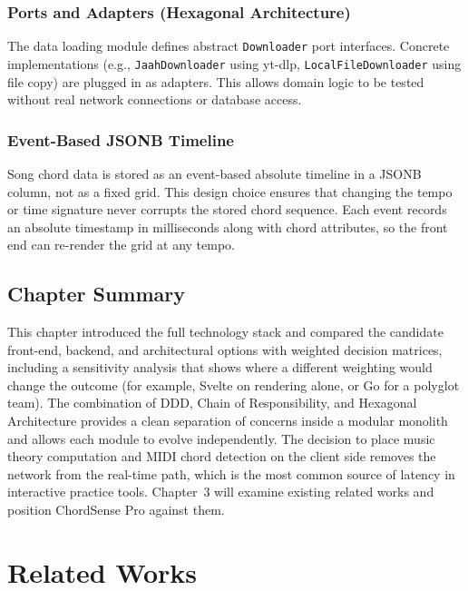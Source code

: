\documentclass[a4paper]{article}
\begin{document}
\subsubsection{Ports and Adapters (Hexagonal Architecture)}

The data loading module defines abstract \texttt{Downloader} port interfaces. Concrete implementations (e.g., \texttt{JaahDownloader} using yt-dlp, \texttt{LocalFileDownloader} using file copy) are plugged in as adapters. This allows domain logic to be tested without real network connections or database access.

\subsubsection{Event-Based JSONB Timeline}\label{sec:jsonb_timeline}

Song chord data is stored as an event-based absolute timeline in a JSONB column, not as a fixed grid. This design choice ensures that changing the tempo or time signature never corrupts the stored chord sequence. Each event records an absolute timestamp in milliseconds along with chord attributes, so the front end can re-render the grid at any tempo.

\subsection{Chapter Summary}

This chapter introduced the full technology stack and compared the candidate front-end, backend, and architectural options with weighted decision matrices, including a sensitivity analysis that shows where a different weighting would change the outcome (for example, Svelte on rendering alone, or Go for a polyglot team). The combination of DDD, Chain of Responsibility, and Hexagonal Architecture provides a clean separation of concerns inside a modular monolith and allows each module to evolve independently. The decision to place music theory computation and MIDI chord detection on the client side removes the network from the real-time path, which is the most common source of latency in interactive practice tools. Chapter~3 will examine existing related works and position ChordSense Pro against them.

\newpage
\section{Related Works}
\end{document}
